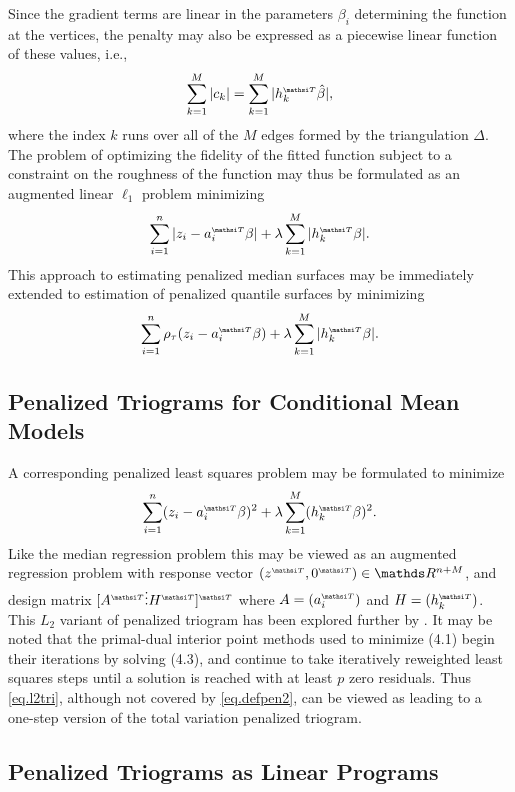 Since the gradient terms are linear in the 
parameters $\beta_i$
determining the function at the vertices, the penalty may also be 
expressed as a piecewise linear function of these values, i.e.,
\[
\sum_{k=1}^M |c_k | = \sum_{k=1}^M | h_k \trans \hat \beta |,
\]
where the index $k$ runs over all of the $M$ edges formed by the triangulation
$\Delta$.  
The problem of optimizing the fidelity of the fitted function subject to a 
constraint on the roughness of the function may thus be formulated as
an augmented linear $\ell_1$ problem minimizing
\begin{equation}
\sum_{i=1}^n |z_i -a_i \trans \beta | + \lambda \sum_{k=1}^M |h_k \trans \beta|.
\label{eq.augtri}
\end{equation}
This approach to estimating penalized median surfaces may be immediately
extended to estimation of penalized quantile surfaces by minimizing
\begin{equation}
\sum_{i=1}^n \rho_\tau (z_i -a_i \trans \beta ) + 
\lambda \sum_{k=1}^M |h_k \trans \beta|.
\label{eq.augtrirq}
\end{equation}


\subsection{Penalized Triograms for Conditional Mean Models}
A corresponding penalized least squares problem may be formulated to minimize
\begin{equation}
\sum_{i=1}^n (z_i -a_i \trans \beta )^2 + \lambda \sum_{k=1}^M (h_k \trans \beta )^2.
\label{eq.l2tri}
\end{equation}
Like the median regression problem this may be viewed as an augmented
regression problem with response vector
$(z \trans,0 \trans) \in \RR^{n+M}$, and design
matrix $[A
\trans \vdots H \trans ] \trans $ where $A = (a_i \trans )$ and
$H=(h_k \trans )$.
This $L_2$ variant of penalized triogram has been explored further by 
. 
It may be noted that the primal-dual interior point methods used to
minimize (4.1) begin their iterations by solving (4.3),
and continue to take iteratively reweighted least squares
steps until a solution is reached with at least $p$ zero residuals.
Thus \eqref{eq.l2tri}, although not covered by \eqref{eq.defpen2}, 
can be viewed as leading to a one-step version of the
total variation penalized triogram.


\subsection{Penalized Triograms as Linear Programs}

